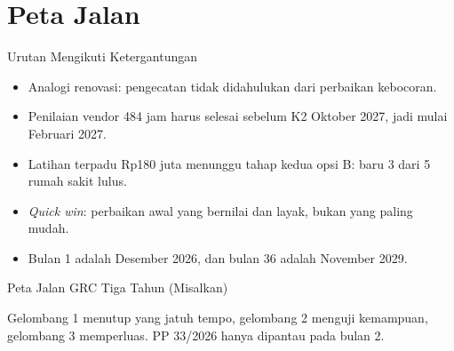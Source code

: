 \documentclass[aspectratio=169, table, 12pt]{beamer}
\begin{document}
\section{Peta Jalan}

\begin{frame}{{\Large Urutan Mengikuti Ketergantungan}}
  \vspace{6pt}
  \small
  \begin{itemize}
    \item Analogi renovasi: pengecatan tidak didahulukan dari perbaikan kebocoran.
    \item Penilaian vendor 484 jam harus selesai sebelum K2 Oktober 2027, jadi mulai Februari 2027.
    \item Latihan terpadu Rp180 juta menunggu tahap kedua opsi B: baru 3 dari 5 rumah sakit lulus.
    \item \textit{Quick win}: perbaikan awal yang bernilai dan layak, bukan yang paling mudah.
    \item Bulan 1 adalah Desember 2026, dan bulan 36 adalah November 2029.
  \end{itemize}
\end{frame}

\begin{frame}{{\Large Peta Jalan GRC Tiga Tahun (Misalkan)}}
  \vspace{0pt}
  \begin{center}
    \resizebox{!}{0.66\textheight}{}
  \end{center}
  \vspace{-6pt}
  \footnotesize Gelombang 1 menutup yang jatuh tempo, gelombang 2 menguji kemampuan, gelombang 3
  memperluas. PP 33/2026 hanya dipantau pada bulan 2.
\end{frame}
\end{document}
